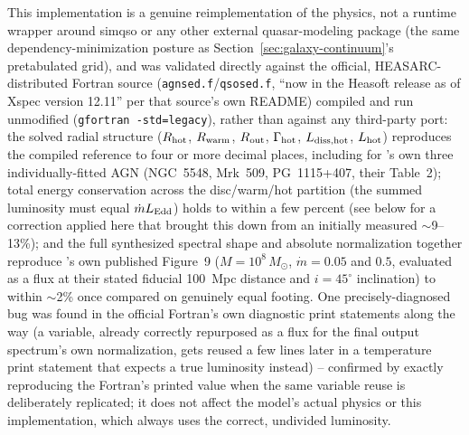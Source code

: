 \documentclass{aastex7}
\begin{document}
This implementation is a genuine reimplementation of the physics, not a
runtime wrapper around simqso or any other external quasar-modeling
package (the same dependency-minimization posture as
Section~\ref{sec:galaxy-continuum}'s pretabulated grid), and was validated
directly against the official, HEASARC-distributed Fortran source
(\texttt{agnsed.f}/\texttt{qsosed.f}, ``now in the Heasoft release as of
Xspec version 12.11'' per that source's own README) compiled and run
unmodified (\texttt{gfortran -std=legacy}), rather than against any
third-party port: the solved radial structure ($R_{\rm hot}$, $R_{\rm
warm}$, $R_{\rm out}$, $\Gamma_{\rm hot}$, $L_{\rm diss,hot}$, $L_{\rm hot}$)
reproduces the compiled reference to four or more decimal places, including
for \citet{KubotaDone2018}'s own three individually-fitted AGN (NGC~5548,
Mrk~509, PG~1115+407, their Table~2); total energy conservation across the
disc/warm/hot partition (the summed luminosity must equal $\dot m
L_{\rm Edd}$) holds to within a few percent (see below for a correction
applied here that brought this down from an initially measured
$\sim$9--13\%); and the full synthesized spectral shape and absolute
normalization together reproduce \citet{KubotaDone2018}'s own published
Figure~9 ($M=10^8\,M_\odot$, $\dot m=0.05$ and $0.5$, evaluated as a flux
at their stated fiducial 100~Mpc distance and $i=45^\circ$ inclination) to
within $\sim$2\% once compared on genuinely equal footing. One
precisely-diagnosed bug was found in the official Fortran's own diagnostic
print statements along the way (a variable, already correctly repurposed
as a flux for the final output spectrum's own normalization, gets reused a
few lines later in a temperature print statement that expects a true
luminosity instead) -- confirmed by exactly reproducing the Fortran's
printed value when the same variable reuse is deliberately replicated; it
does not affect the model's actual physics or this implementation, which
always uses the correct, undivided luminosity.
\end{document}
